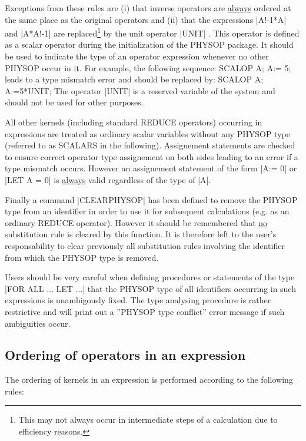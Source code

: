 Exceptions from these rules are (i) that inverse operators are
\underline{always} ordered at the same place as the original operators
and (ii) that  the expressions |A!-1*A|
and |A*A!-1| are replaced\footnote{This may not always occur in
intermediate steps of a calculation  due to efficiency reasons.}
by the unit operator |UNIT| .
This operator is defined
as a scalar operator during the initialization of the PHYSOP package.
It should be used to indicate
the type of an operator expression whenever no other PHYSOP
occur in it. For example, the following sequence:
\begintt
SCALOP A;
A:= 5;
\endtt
leads to a type mismatch error and should be replaced by:
\begintt
SCALOP A;
A:=5*UNIT;
\endtt
The operator |UNIT| is a reserved variable of the system and should
not be used for other purposes.

All other kernels  (including standard REDUCE operators)
occurring in expressions are treated as ordinary scalar variables
without any PHYSOP type (referred to as SCALARS in the
following).
Assignement statements are checked to ensure correct operator
type assignement on both sides leading to an error if a type
mismatch occurs. However an assignement statement of the form
|A:= 0| or |LET A = 0| is \underline{always} valid regardless of the
type of |A|.

Finally a command |CLEARPHYSOP| 
has been defined to remove
the PHYSOP type from an identifier in order to use it for subsequent
calculations (e.g. as an ordinary REDUCE operator). However it should be
remembered that \underline{no}
substitution rule is cleared by this function. It
is therefore left to the user's responsability to clear previously all
substitution rules involving the identifier from which the PHYSOP type
is removed.

Users should be very careful when defining procedures or statements of
the type |FOR ALL ... LET ...| that the PHYSOP type of all identifiers
occurring in such expressions is unambigously fixed. The type analysing
procedure is rather restrictive and will print out a ''PHYSOP type
conflict'' error message if such ambiguities occur.

\subsection{Ordering of operators in an expression}

The ordering of kernels in an expression is performed according to
the following rules:

